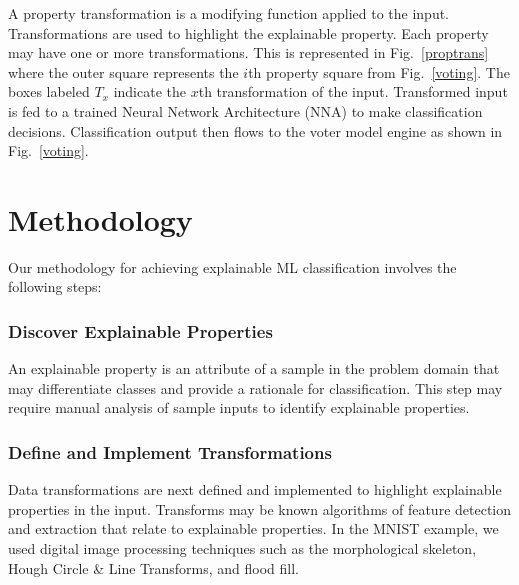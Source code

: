 \documentclass[conference]{IEEEtran}
\begin{document}
A property transformation is a modifying function applied to the input.  Transformations are used to highlight the explainable property.  Each property may have one or more transformations.   This is represented in Fig.~\ref{proptrans} where the outer square represents the $i$th property square from Fig.~\ref{voting}.  The boxes labeled $T_x$ indicate the $x$th transformation of the input.  Transformed input is fed to a trained Neural Network Architecture (NNA) to make classification decisions.  Classification output then flows to the voter model engine as shown in Fig.~\ref{voting}.

\section{Methodology}
 
Our methodology for achieving explainable ML classification involves the following steps:

\subsubsection{Discover Explainable Properties}
An explainable property is an attribute of a sample in the problem domain that may differentiate classes and provide a rationale for classification.  This step may require manual analysis of sample inputs to identify explainable properties.

\subsubsection{Define and Implement Transformations}
Data transformations are next defined and implemented to highlight explainable properties in the input.  Transforms may be known algorithms of feature detection and extraction that relate to explainable properties.  In the MNIST example, we used digital image processing techniques such as the morphological skeleton, Hough Circle \& Line Transforms, and flood fill.
\end{document}
